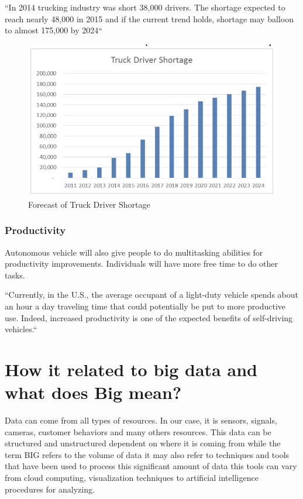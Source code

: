 \documentclass{acm_proc_article-sp}
\begin{document}
\begin{center}
    ``In 2014 trucking industry was short 38,000 drivers. The shortage expected to reach nearly 48,000 in 2015 and if the current trend holds, shortage may balloon to almost 175,000 by 2024``\cite{ATA}
\end{center}

\begin{figure}[h]
  \centering
      \includegraphics[width=1.0\columnwidth]{images/picture8.png}
  \caption{Forecast of Truck Driver Shortage}\label{F:small}
\end{figure}

\subsubsection{Productivity}Autonomous vehicle will also give people to do multitasking abilities for productivity improvements. Individuals will have more free time to do other tasks. 

\begin{center}
    ``Currently, in the U.S., the average occupant of a light-duty vehicle spends about an hour a
day traveling time that could potentially be put to more productive use. Indeed, increased
productivity is one of the expected benefits of self-driving vehicles.``\cite{michigan}
\end{center}



\section{How it related to big data and what does Big mean?}
\par Data can come from all types of resources. In our case, it is sensors, signals, cameras, customer behaviors and many others resources. This data can be structured and unstructured dependent on where it is coming from while the term BIG refers to the volume of data it may also refer to techniques and tools that have been used to process this significant amount of data this tools can vary from cloud computing, visualization techniques to artificial intelligence procedures for analyzing.\cite{www-webo}
\end{document}
